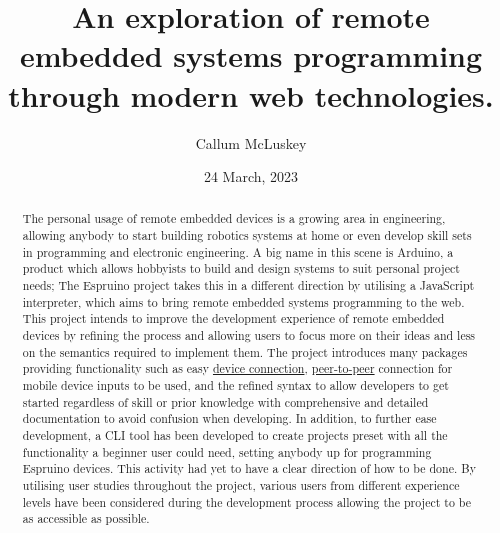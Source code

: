 \documentclass{l4proj}
\begin{document}
\title{An exploration of remote embedded systems programming through modern web technologies.}
\author{Callum McLuskey}
\date{24 March, 2023}


\maketitle

\begin{abstract}

    The personal usage of remote embedded devices is a growing area in engineering, allowing anybody to start building robotics systems at home or even develop skill sets in programming and electronic engineering. A big name in this scene is Arduino, a product which allows hobbyists to build and design systems to suit personal project needs; The Espruino project takes this in a different direction by utilising a JavaScript interpreter, which aims to bring remote embedded systems programming to the web. This project intends to improve the development experience of remote embedded devices by refining the process and allowing users to focus more on their ideas and less on the semantics required to implement them. The project introduces many packages providing functionality such as easy \href{https://github.com/espruino-tools/core}{device connection}, \href{https://github.com/espruino-tools/peer}{peer-to-peer} connection for mobile device inputs to be used, and the refined syntax to allow developers to get started regardless of skill or prior knowledge with comprehensive and detailed documentation to avoid confusion when developing. In addition, to further ease development, a CLI tool has been developed to create projects preset with all the functionality a beginner user could need, setting anybody up for programming Espruino devices. This activity had yet to have a clear direction of how to be done. By utilising user studies throughout the project, various users from different experience levels have been considered during the development process allowing the project to be as accessible as possible.

\end{abstract}

\def\consentname {Callum McLuskey} %
\def\consentdate {23 March 2023} %

\educationalconsent
\end{document}
